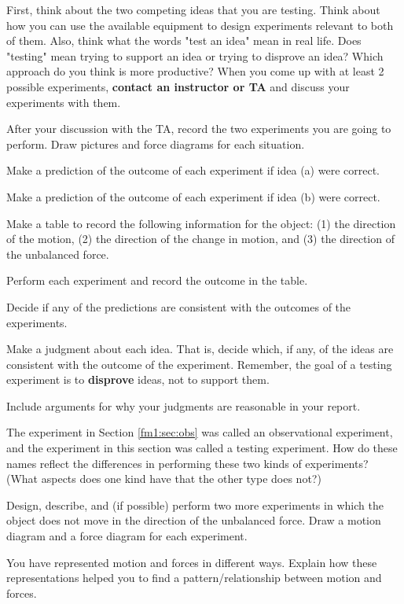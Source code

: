 \begin{steps}
	\item First, think about the two competing ideas that you are testing. Think about how you can use the available equipment to design experiments relevant to both of them. Also, think what the words "test an idea" mean in real life. Does "testing" mean trying to support an idea or trying to disprove an idea? Which approach do you think is more productive? When you come up with at least 2 possible experiments, \textbf{contact an instructor or TA} and discuss your experiments with them.
	
	\item After your discussion with the TA, record the two experiments you are going to perform. Draw pictures and force diagrams for each situation.
	
	\item Make a prediction of the outcome of each experiment if idea (a) were correct.
	
	\item Make a prediction of the outcome of each experiment if idea (b) were correct.
	
	\item Make a table to record the following information for the object: (1) the direction of the motion, (2) the direction of the change in motion, and (3) the direction of the unbalanced force.
	
	\item Perform each experiment and record the outcome in the table.
	
	\item Decide if any of the predictions are consistent with the outcomes of the experiments.
	
	\item Make a judgment about each idea.  That is, decide which, if any, of the ideas are consistent with the outcome of the experiment. Remember, the goal of a testing experiment is to \textbf{disprove} ideas, not to support them.
	
	\item Include arguments for why your judgments are reasonable in your report.
	
	\item The experiment in Section \ref{fm1:sec:obs} was called an observational experiment, and the experiment in this section was called a testing experiment. How do these names reflect the differences in performing these two kinds of experiments? (What aspects does one kind have that the other type does not?)
	
	\item Design, describe, and (if possible) perform two more experiments in which the object does not move in the direction of the unbalanced force. Draw a motion diagram and a force diagram for each experiment.
	
	\item You have represented motion and forces in different ways.  Explain how these representations helped you to find a pattern/relationship between motion and forces.
\end{steps}

